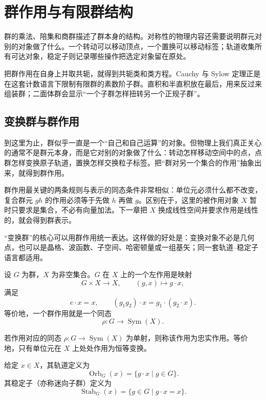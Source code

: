 \section{群作用与有限群结构}
\label{chap:finite-group-structure}

群的乘法、陪集和商群描述了群本身的结构。对称性的物理内容还需要说明群元对别的对象做了什么。一个转动可以移动顶点，一个置换可以移动标签；轨道收集所有可达对象，稳定子则记录哪些操作把选定对象留在原处。

把群作用在自身上并取共轭，就得到共轭类和类方程。Cauchy 与 Sylow 定理正是在这套计数语言下限制有限群的素数阶子群。直积和半直积放在最后，用来反过来组装群；二面体群会显示“一个子群怎样扭转另一个正规子群”。

\subsection{变换群与群作用}
\label{sec:group-actions}

到这里为止，群似乎一直是一个“自己和自己运算”的对象。但物理上我们真正关心的通常不是群元本身，而是它对别的对象做了什么：转动怎样移动空间中的点，点群怎样变换原子轨道，置换怎样交换粒子标签。把“群对另一个集合的作用”抽象出来，就得到群作用。

群作用最关键的两条规则与表示的同态条件非常相似：单位元必须什么都不改变，复合群元 $gh$ 的作用必须等于先做 $h$ 再做 $g$。区别在于，这里的被作用对象 $X$ 暂时只要求是集合，不必有向量加法。下一章把 $X$ 换成线性空间并要求作用是线性的，就会得到群表示。

“变换群”的核心可以用群作用统一表达。这样做的好处是：变换对象不必是几何点，也可以是晶格、波函数、子空间、哈密顿量或一组基矢；同一套轨道--稳定子语言都适用。

\begin{definition}[群作用]
设 $G$ 为群，$X$ 为非空集合。$G$ 在 $X$ 上的一个左作用是映射
\[
G\times X\longrightarrow X,
\qquad
(g,x)\longmapsto g\cdot x,
\]
满足
\[
e\cdot x=x,
\qquad
(g_1g_2)\cdot x=g_1\cdot(g_2\cdot x).
\label{eq:group-action}
\]
等价地，一个群作用就是一个同态
\[
\rho:G\longrightarrow\operatorname{Sym}(X).
\]
\label{def:group-action}
\end{definition}

\begin{definition}[忠实作用]
若作用对应的同态 $\rho:G\to\operatorname{Sym}(X)$ 为单射，则称该作用为忠实作用。等价地，只有单位元在 $X$ 上处处作用为恒等变换。
\label{def:faithful-action}
\end{definition}

\begin{definition}[轨道与稳定子]
给定 $x\in X$，其轨道定义为
\[
\operatorname{Orb}_G(x)=\{g\cdot x\mid g\in G\}.
\]
其稳定子（亦称迷向子群）定义为
\[
\operatorname{Stab}_G(x)=\{g\in G\mid g\cdot x=x\}.
\]
\label{def:orbit-stabilizer}
\end{definition}

